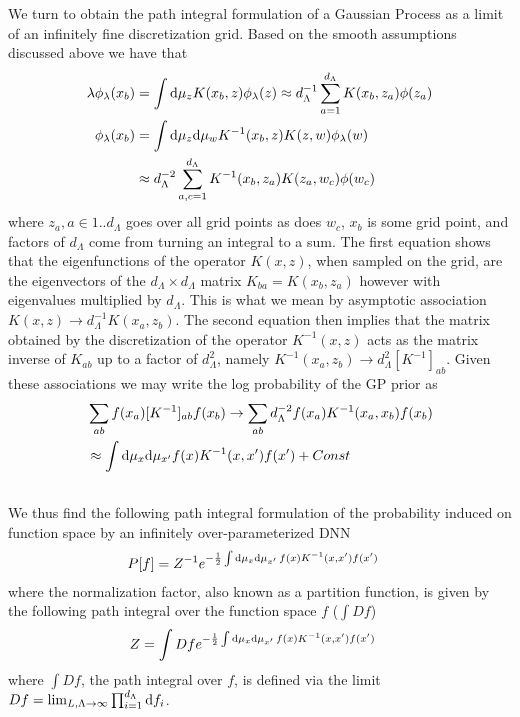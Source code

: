 We turn to obtain the path integral formulation of a Gaussian Process as a limit of an infinitely fine discretization grid. Based on the smooth assumptions discussed above we have that 
\begin{align}
\lambda \phi_{\lambda}(x_b) &= \int \text{d}\mu_z K(x_b,z) \phi_{
\lambda}(z) \approx d_{\Lambda}^{-1} \sum_{a=1}^{d_{\Lambda}} K(x_b,z_a) \phi(z_a) \\ \nonumber
\phi_{\lambda}(x_b) &= \int \text{d}\mu_z \text{d}\mu_w K^{-1}(x_b,z)K(z,w) \phi_{
\lambda}(w) \\ \nonumber 
&\approx d_{\Lambda}^{-2} \sum_{a,c=1}^{d_{\Lambda}} K^{-1}(x_b,z_a) K(z_a,w_c) \phi(w_c) 
\end{align}
where $z_a, a \in 1..d_{\Lambda}$ goes over all grid points as does $w_c$, $x_b$ is some grid point, and factors of $d_{\Lambda}$ come from turning an integral to a sum. The first equation shows that the eigenfunctions of the operator $K(x,z)$, when sampled on the grid, are the eigenvectors of the $d_{\Lambda} \times d_{\Lambda}$ matrix $K_{ba}=K(x_b,z_a)$ however with eigenvalues multiplied by $d_{\Lambda}$. This is what we mean by  asymptotic association $K(x,z) \rightarrow d_{\Lambda}^{-1}K(x_a,z_b)$. The second equation then implies that the matrix obtained by the discretization of the operator $K^{-1}(x,z)$ acts as the matrix inverse of $K_{ab}$ up to a factor of $d_{\Lambda}^2$, namely $K^{-1}(x_a,z_b) \rightarrow d_{\Lambda}^{2}[K^{-1}]_{ab}$. Given these associations we may write the log probability of the GP prior as  
\begin{align}
&\sum_{ab} f(x_a) [K^{-1}]_{ab} f(x_b) \rightarrow \sum_{ab} d_{\Lambda}^{-2}  f(x_a) K^{-1}(x_a,x_b) f(x_b) \\ \nonumber  &\approx \int \text{d}\mu_x \text{d}\mu_{x'} f(x) K^{-1}(x,x') f(x') + Const\\ \nonumber 
\end{align}
We thus find the following path integral formulation of the probability induced on function space by an infinitely over-parameterized DNN 
\begin{align}
P[f] &= Z^{-1} e^{-\frac{1}{2} \int \text{d}\mu_x \text{d}\mu_{x'} \,f(x) K^{-1}(x,x') f(x')}
\end{align}
where the normalization factor, also known as a partition function, is given by the following path integral over the function space $f$ ($\int Df$)
\begin{align}
Z &= \int Df  e^{-\frac{1}{2} \int \text{d}\mu_x \text{d}\mu_{x'} \, f(x) K^{-1}(x,x') f(x')}
\end{align}
where $\int Df$, the path integral over $f$, is defined via the limit $Df = \lim_{L,\Lambda\to \infty}\prod_{i=1}^{d_{\Lambda}} \text{d} f_i$. 

